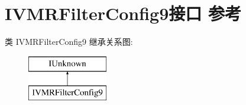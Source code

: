 \hypertarget{interface_i_v_m_r_filter_config9}{}\section{I\+V\+M\+R\+Filter\+Config9接口 参考}
\label{interface_i_v_m_r_filter_config9}
类 I\+V\+M\+R\+Filter\+Config9 继承关系图\+:\begin{figure}[H]
\begin{center}
\leavevmode
\includegraphics[height=2.000000cm]{interface_i_v_m_r_filter_config9}
\end{center}
\end{figure}
